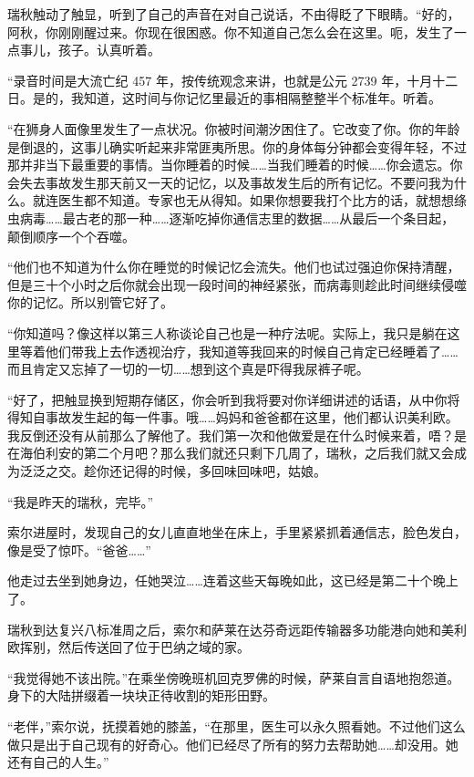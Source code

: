 \documentclass[AutoFakeBold=true]{book}
\begin{document}
瑞秋触动了触显，听到了自己的声音在对自己说话，不由得眨了下眼睛。``好的，阿秋，你刚刚醒过来。你现在很困惑。你不知道自己怎么会在这里。呃，发生了一点事儿，孩子。认真听着。

``录音时间是大流亡纪 457 年，按传统观念来讲，也就是公元 2739 年，十月十二日。是的，我知道，这时间与你记忆里最近的事相隔整整半个标准年。听着。

``在狮身人面像里发生了一点状况。你被时间潮汐困住了。它改变了你。你的年龄是倒退的，这事儿确实听起来非常匪夷所思。你的身体每分钟都会变得年轻，不过那并非当下最重要的事情。当你睡着的时候……当我们睡着的时候……你会遗忘。你会失去事故发生那天前又一天的记忆，以及事故发生后的所有记忆。不要问我为什么。就连医生都不知道。专家也无从得知。如果你想要我打个比方的话，就想想绦虫病毒……最古老的那一种……逐渐吃掉你通信志里的数据……从最后一个条目起，颠倒顺序一个个吞噬。

``他们也不知道为什么你在睡觉的时候记忆会流失。他们也试过强迫你保持清醒，但是三十个小时之后你就会出现一段时间的神经紧张，而病毒则趁此时间继续侵噬你的记忆。所以别管它好了。

``你知道吗？像这样以第三人称谈论自己也是一种疗法呢。实际上，我只是躺在这里等着他们带我上去作透视治疗，我知道等我回来的时候自己肯定已经睡着了……而且肯定又忘掉了一切的一切……想到这个真是吓得我尿裤子呢。

``好了，把触显换到短期存储区，你会听到我将要对你详细讲述的话语，从中你将得知自事故发生起的每一件事。哦……妈妈和爸爸都在这里，他们都认识美利欧。我反倒还没有从前那么了解他了。我们第一次和他做爱是在什么时候来着，唔？是在海伯利安的第二个月吧？那么我们就还只剩下几周了，瑞秋，之后我们就又会成为泛泛之交。趁你还记得的时候，多回味回味吧，姑娘。

``我是昨天的瑞秋，完毕。''

索尔进屋时，发现自己的女儿直直地坐在床上，手里紧紧抓着通信志，脸色发白，像是受了惊吓。``爸爸……''

他走过去坐到她身边，任她哭泣……连着这些天每晚如此，这已经是第二十个晚上了。

\vspace*{1em}

瑞秋到达复兴八标准周之后，索尔和萨莱在达芬奇远距传输器多功能港向她和美利欧挥别，然后传送回了位于巴纳之域的家。

``我觉得她不该出院。''在乘坐傍晚班机回克罗佛的时候，萨莱自言自语地抱怨道。身下的大陆拼缀着一块块正待收割的矩形田野。

``老伴，''索尔说，抚摸着她的膝盖，``在那里，医生可以永久照看她。不过他们这么做只是出于自己现有的好奇心。他们已经尽了所有的努力去帮助她……却没用。她还有自己的人生。''
\end{document}
